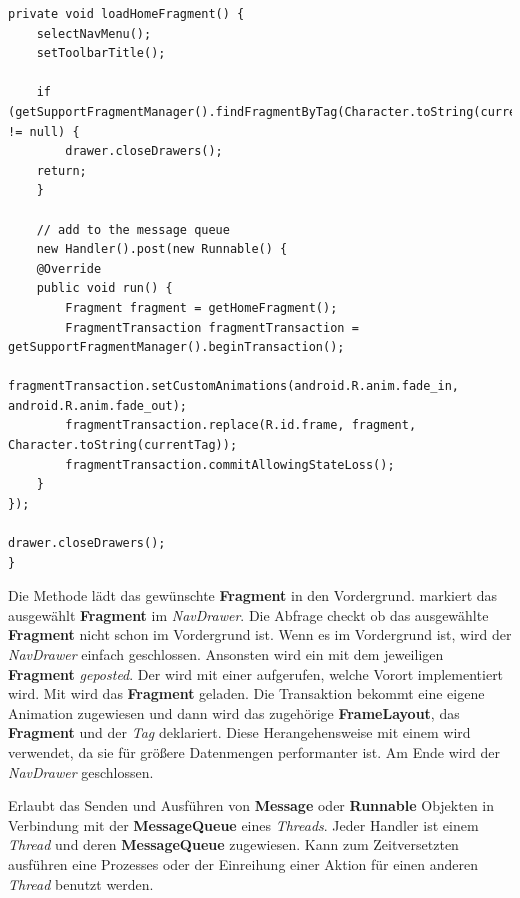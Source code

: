 \begin{lstlisting}[caption={Hub loadHomeFragment() Methode},captionpos=b]
private void loadHomeFragment() {
	selectNavMenu();
	setToolbarTitle();

	if (getSupportFragmentManager().findFragmentByTag(Character.toString(currentTag)) != null) {
		drawer.closeDrawers();
	return;
	}

	// add to the message queue
	new Handler().post(new Runnable() {
	@Override
	public void run() {
		Fragment fragment = getHomeFragment();
		FragmentTransaction fragmentTransaction = getSupportFragmentManager().beginTransaction();
		fragmentTransaction.setCustomAnimations(android.R.anim.fade_in, android.R.anim.fade_out);
		fragmentTransaction.replace(R.id.frame, fragment, Character.toString(currentTag));
		fragmentTransaction.commitAllowingStateLoss();
	}
});

drawer.closeDrawers();
}
\end{lstlisting}

Die Methode  lädt das gewünschte \textbf{Fragment} in den
Vordergrund.  markiert das ausgewählt \textbf{Fragment} im
\emph{NavDrawer}. Die  Abfrage checkt ob das ausgewählte 
\textbf{Fragment} nicht schon im Vordergrund ist. Wenn es im Vordergrund ist,
wird der \emph{NavDrawer} einfach geschlossen. Ansonsten wird ein 
mit dem jeweiligen \textbf{Fragment} \emph{geposted}. Der  wird
mit einer  aufgerufen, welche Vorort implementiert wird. Mit
 wird das \textbf{Fragment} geladen. Die Transaktion
bekommt eine eigene Animation zugewiesen und dann wird das zugehörige
\textbf{FrameLayout}, das \textbf{Fragment} und der \emph{Tag} deklariert. Diese
Herangehensweise mit einem  wird verwendet, da sie für größere
Datenmengen performanter ist. Am Ende wird der \emph{NavDrawer} geschlossen.

\begin{infobox}[frametitle=Handler]
Erlaubt das Senden und Ausführen von \textbf{Message} oder \textbf{Runnable}
Objekten in Verbindung mit der \textbf{MessageQueue} eines \emph{Threads}. Jeder
Handler ist einem \emph{Thread} und deren \textbf{MessageQueue} zugewiesen.
Kann zum Zeitversetzten ausführen eine Prozesses oder der Einreihung einer
Aktion für einen anderen \emph{Thread} benutzt werden.
\end{infobox}

